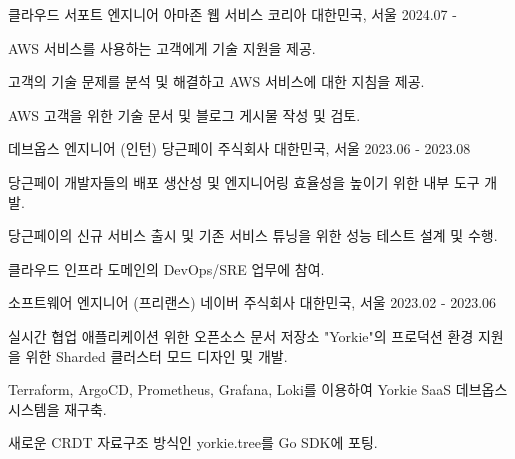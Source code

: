 

\begin{cventries}

\cventry
{클라우드 서포트 엔지니어} %
{아마존 웹 서비스 코리아} %
{대한민국, 서울} %
{2024.07 - } %
{
  \begin{cvitems} %
    \item {AWS 서비스를 사용하는 고객에게 기술 지원을 제공.}
    \item {고객의 기술 문제를 분석 및 해결하고 AWS 서비스에 대한 지침을 제공.}
    \item {AWS 고객을 위한 기술 문서 및 블로그 게시물 작성 및 검토.}
  \end{cvitems}
}

  \cventry
    {데브옵스 엔지니어 (인턴)} %
    {당근페이 주식회사} %
    {대한민국, 서울} %
    {2023.06 - 2023.08} %
    {
      \begin{cvitems} %
        \item {당근페이 개발자들의 배포 생산성 및 엔지니어링 효율성을 높이기 위한 내부 도구 개발.}
        \item {당근페이의 신규 서비스 출시 및 기존 서비스 튜닝을 위한 성능 테스트 설계 및 수행.}
        \item {클라우드 인프라 도메인의 DevOps/SRE 업무에 참여.}
      \end{cvitems}
    }

  \cventry
    {소프트웨어 엔지니어 (프리랜스)} %
    {네이버 주식회사} %
    {대한민국, 서울} %
    {2023.02 - 2023.06} %
    {
      \begin{cvitems} %
        \item {실시간 협업 애플리케이션 위한 오픈소스 문서 저장소 "Yorkie"의 프로덕션 환경 지원을 위한 Sharded 클러스터 모드 디자인 및 개발.}
        \item {Terraform, ArgoCD, Prometheus, Grafana, Loki를 이용하여 Yorkie SaaS 데브옵스 시스템을 재구축.}
        \item {새로운 CRDT 자료구조 방식인 yorkie.tree를 Go SDK에 포팅.}  
      \end{cvitems}
    }


\end{cventries}
